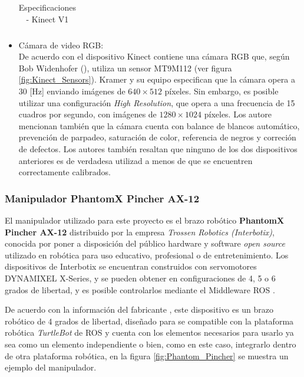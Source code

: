 \begin{itemize}
\begin{table}
\begin{tabular}{|c|c|}
                \hline
                \end{tabular}
                \caption{Especificaciones - Kinect V1}
                \label{tab:Kinect_especs}
            \end{table}

            \item Cámara de video RGB: \\
            De acuerdo con \cite{kramer_hacking_2012} el dispositivo Kinect contiene una cámara RGB que, según Bob Widenhofer (\cite*{eetimes_inside_2010}), utiliza un sensor MT9M112 (ver figura \ref{fig:Kinect_Sensors}). Kramer y su equipo especifican que la cámara opera a 30 [Hz] enviando imágenes de $640\times512$ píxeles. Sin embargo, es posible utilizar una configuración \textit{High Resolution}, que opera a una frecuencia de 15 cuadros por segundo, con imágenes de $1280\times1024$ píxeles. Los autore mencionan también que la cámara cuenta con balance de blancos automático, prevención de parpadeo, saturación de color, referencia de negros y correción de defectos. Los autores también resaltan que ninguno de los dos dispositivos anteriores es de verdadesa utilizad a menos de que se encuentren correctamente calibrados. 
            \end{itemize}
            
            \subsubsection{Manipulador PhantomX Pincher AX-12}
            El manipulador utilizado para este proyecto es el brazo robótico \textbf{PhantomX Pincher AX-12} distribuido por la empresa \textit{Trossen Robotics (Interbotix)}, conocida por poner a disposición del público hardware y software \textit{open source} utilizado en robótica para uso educativo, profesional o de entretenimiento. Los dispositivos de Interbotix se encuentran construidos con servomotores DYNAMIXEL X-Series, y se pueden obtener en configuraciones de 4, 5 o 6 grados de libertad, y es posible controlarlos mediante el Middleware ROS \cite{Interbotix_interbotix}. 
            
            De acuerdo con la información del fabricante \cite{Interbotix_widowx_PincherArm}, este dispositivo es un brazo robótico de 4 grados de libertad, diseñado para se compatible con la plataforma robótica \textit{TurtleBot} de ROS y cuenta con los elementos necesarios para usarlo ya sea como un elemento independiente o bien, como en este caso, integrarlo dentro de otra plataforma robótica, en la figura \ref{fig:Phantom_Pincher} se muestra un ejemplo del manipulador.\newpage
            
